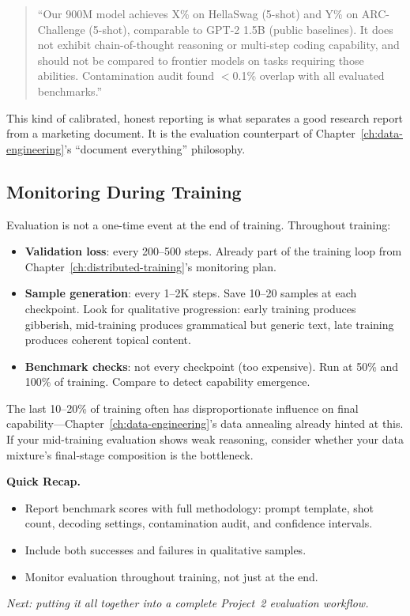 \begin{quote}
\small
``Our 900M model achieves X\% on HellaSwag (5-shot) and Y\% on ARC-Challenge (5-shot), comparable to GPT-2 1.5B (public baselines). It does not exhibit chain-of-thought reasoning or multi-step coding capability, and should not be compared to frontier models on tasks requiring those abilities. Contamination audit found $<$0.1\% overlap with all evaluated benchmarks.''
\end{quote}

This kind of calibrated, honest reporting is what separates a good research report from a marketing document. It is the evaluation counterpart of Chapter~\ref{ch:data-engineering}'s ``document everything'' philosophy.

\subsection{Monitoring During Training}

Evaluation is not a one-time event at the end of training. Throughout training:

\begin{itemize}[nosep]
  \item \textbf{Validation loss}: every 200--500 steps. Already part of the training loop from Chapter~\ref{ch:distributed-training}'s monitoring plan.
  \item \textbf{Sample generation}: every 1--2K steps. Save 10--20 samples at each checkpoint. Look for qualitative progression: early training produces gibberish, mid-training produces grammatical but generic text, late training produces coherent topical content.
  \item \textbf{Benchmark checks}: not every checkpoint (too expensive). Run at 50\% and 100\% of training. Compare to detect capability emergence.
\end{itemize}

The last 10--20\% of training often has disproportionate influence on final capability---Chapter~\ref{ch:data-engineering}'s data annealing already hinted at this. If your mid-training evaluation shows weak reasoning, consider whether your data mixture's final-stage composition is the bottleneck.

\begin{quickrecap}
\textbf{Quick Recap.}
\begin{itemize}[nosep,leftmargin=1.5em]
  \item Report benchmark scores with full methodology: prompt template, shot count, decoding settings, contamination audit, and confidence intervals.
  \item Include both successes and failures in qualitative samples.
  \item Monitor evaluation throughout training, not just at the end.
\end{itemize}
\textit{Next: putting it all together into a complete Project~2 evaluation workflow.}
\end{quickrecap}


